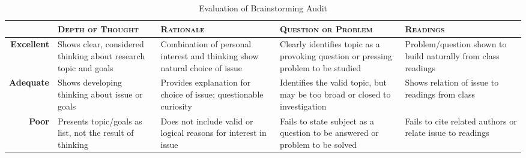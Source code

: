 \documentclass[12pt]{amsart}	%
\begin{document}
\begin{table}[b]
	\caption{Evaluation of Brainstorming Audit}\label{tab:rubric}
\begin{tabulary}{\textwidth}{rLLLL}
	\toprule  & \textbf{\textsc{Depth of Thought}} & \textbf{\textsc{Rationale}} & \textbf{\textsc{Question or Problem}} & \textbf{\textsc{Readings}}\\
\midrule	\textbf{Excellent} & Shows clear, considered thinking about research topic and goals & Combination of personal interest and thinking show natural choice of issue & Clearly identifies topic as a provoking question or pressing problem to be studied & Problem/question shown to build naturally from class readings \\
\midrule	\textbf{Adequate} & Shows developing thinking about issue or goals & Provides explanation for choice of issue; questionable curiosity & Identifies the valid topic, but may be too broad or closed to investigation & Shows relation of issue to readings from class \\
\midrule	\textbf{Poor} & Presents topic/goals as list, not the result of thinking & Does not include valid or logical reasons for interest in issue & Fails to state subject as a question to be answered or problem to be solved & Fails to cite related authors or relate issue to readings \\
	\bottomrule
\end{tabulary}
\end{table}

\begin{comment}
	\section{Formatting} %
	\label{sec:formatting}
	While this document isn't your typical formal research report, you should get in the habit of formatting your documents to meet the guidelines of an appropriate style, such as the \textsc{mla} or \textsc{apa}. An \textsc{mla}-formatted template is available from Webcourses. Regardless, be sure your document meets these requirements:
	\begin{itemize}
		\item double-spaced lines,
		\item one-inch margins on all sides and half-inch indents for paragraphs,
		\item a 12-point typeface with serifs (like Times New Roman, \emph{not} Calibri), and
		\item parenthetical citations and a Works Cited or References page, as appropriate.
	\end{itemize}
\end{comment}
\end{document}

